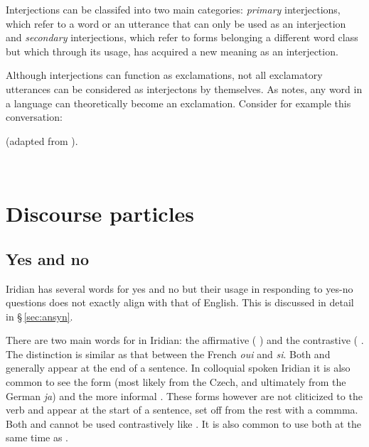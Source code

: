Interjections can be classifed into two main categories: \emph{primary} interjections, which refer to a word or an utterance that can only be used as an interjection and \emph{secondary} interjections, which refer to forms belonging a different word class but which through its usage, has acquired a new meaning as an interjection.

Although interjections can function as exclamations, not all exclamatory utterances can be considered as interjectons by themselves. As \textcite{jovanovic2004} notes, any word in a language can theoretically become an exclamation. Consider for example this conversation:

\ex (adapted from \cite{jovanovic2004}).\\

  \medskip

  \\
\xe


\section{Discourse particles}

\subsection{Yes and no}
Iridian has several words for yes and no but their usage in responding to yes-no questions does not exactly align with that of English. This is discussed in detail in \S\,\ref{sec:ansyn}.

There are two main words for  in Iridian: the affirmative  ( ) and the contrastive  ( . The distinction is similar as that between the French \emph{oui} and \emph{si}. Both  and  generally appear at the end of a sentence. In colloquial spoken Iridian it is also common to see the form  (most likely from the Czech, and ultimately from the German \emph{ja}) and the more informal . These forms however are not cliticized to the verb and appear at the start of a sentence, set off from the rest with a commma. Both  and  cannot be used contrastively like . It is also common to use both  at the same time as .

